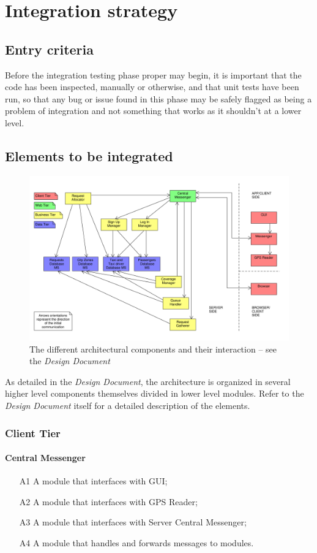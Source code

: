 \chapter{Integration strategy}


\section{Entry criteria}
Before the integration testing phase proper may begin, it is important that the code has been inspected, manually or otherwise, and that unit tests have been run, so that any bug or issue found in this phase may be safely flagged as being a problem of integration and not something that works as it shouldn't at a lower level.


\section{Elements to be integrated}
\begin{figure}
\centering
\includegraphics[width=\textwidth]{tex-images/interactions}
\caption{The different architectural components and their interaction -- see the \emph{Design Document}}
\end{figure}
As detailed in the \emph{Design Document}, the architecture is organized in several higher level components themselves divided in lower level modules. Refer to the \emph{Design Document} itself for a detailed description of the elements.

\subsection{Client Tier}
\subsubsection{Central Messenger}
\begin{itemize}
\item [A1] A module that interfaces with GUI;
\item [A2] A module that interfaces with GPS Reader;
\item [A3] A module that interfaces with Server Central Messenger;
\item [A4] A module that handles and forwards messages to modules.
\end{itemize}

